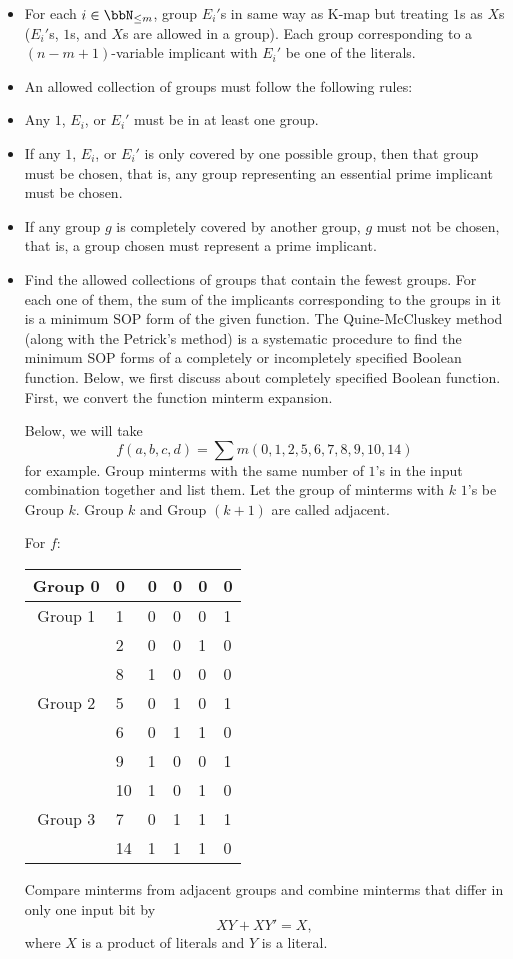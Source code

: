 \documentclass[a4paper,12pt]{article}
\begin{document}
\begin{itemize}
\begin{itemize}
\begin{itemize}
\begin{itemize}
\begin{itemize}
\begin{itemize}
\begin{itemize}
\item For each $i\in\bbN_{\leq m}$, group $E_i'$s in same way as K-map but treating $1$s as $X$s ($E_i'$s, $1$s, and $X$s are allowed in a group). Each group corresponding to a $(n-m+1)$-variable implicant with $E_i'$ be one of the literals.
\item An allowed collection of groups must follow the following rules:
\bit
\item Any $1$, $E_i$, or $E_i'$ must be in at least one group.
\item If any $1$, $E_i$, or $E_i'$ is only covered by one possible group, then that group must be chosen, that is, any group representing an essential prime implicant must be chosen.
\item If any group $g$ is completely covered by another group, $g$ must not be chosen, that is, a group chosen must represent a prime implicant.
\eit
\item Find the allowed collections of groups that contain the fewest groups. For each one of them, the sum of the implicants corresponding to the groups in it is a minimum SOP form of the given function.
\een
{}
The Quine-McCluskey method (along with the Petrick's method) is a systematic procedure to find the minimum SOP forms of a completely or incompletely specified Boolean function. Below, we first discuss about completely specified Boolean function.
First, we convert the function minterm expansion.

Below, we will take
\[f(a,b,c,d)=\sum m(0,1,2,5,6,7,8,9,10,14)\]
for example.
Group minterms with the same number of $1$'s in the input combination together and list them. Let the group of minterms with $k$ $1$'s be Group $k$. Group $k$ and Group $(k+1)$ are called adjacent.

For $f$:
\begin{longtable}[c]{|c|m|mmmm|}
\hline
Group 0 & 0 & 0 & 0 & 0 & 0 \\\hline
Group 1 & 1 & 0 & 0 & 0 & 1 \\\cline{2-6}
& 2 & 0 & 0 & 1 & 0 \\\cline{2-6}
& 8 & 1 & 0 & 0 & 0 \\\hline
Group 2 & 5 & 0 & 1 & 0 & 1 \\\cline{2-6}
& 6 & 0 & 1 & 1 & 0 \\\cline{2-6}
& 9 & 1 & 0 & 0 & 1 \\\cline{2-6}
& 10 & 1 & 0 & 1 & 0 \\\hline
Group 3 & 7 & 0 & 1 & 1 & 1 \\\cline{2-6}
& 14 & 1 & 1 & 1 & 0 \\\hline
\end{longtable}
Compare minterms from adjacent groups and combine minterms that differ in only one input bit by
\[XY+XY'=X,\]
where $X$ is a product of literals and $Y$ is a literal.


\end{itemize}
\end{itemize}
\end{itemize}
\end{itemize}
\end{itemize}
\end{itemize}
\end{itemize}
\end{document}
